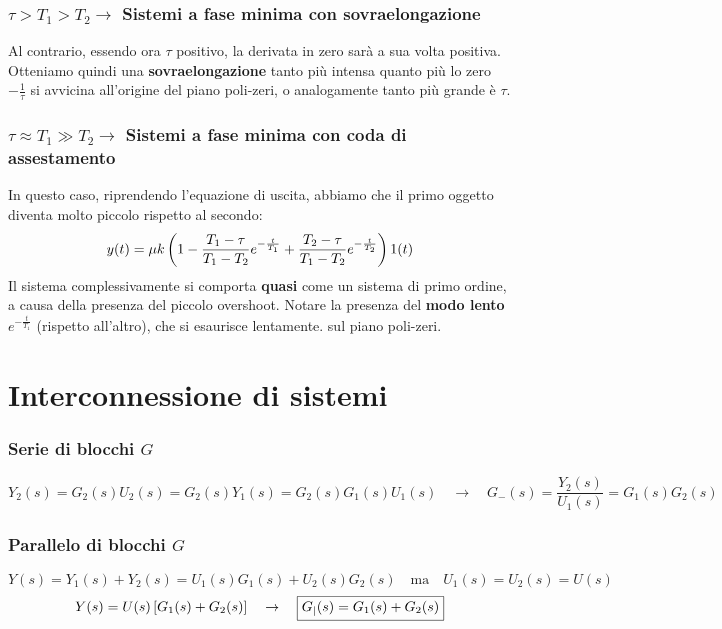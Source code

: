 \subsection{$\tau > T_1 > T_2 \rightarrow$ Sistemi a fase minima con sovraelongazione}
Al contrario, essendo ora $\tau$ positivo, la derivata in zero sarà a sua volta positiva. Otteniamo quindi una \textbf{sovraelongazione} tanto più intensa quanto più lo zero $-\frac{1}{\tau}$ si avvicina all'origine del piano poli-zeri, o analogamente tanto più grande è $\tau$.
\subsection{$\tau \approx T_1 \gg T_2 \rightarrow$ Sistemi a fase minima con coda di assestamento}
In questo caso, riprendendo l'equazione di uscita, abbiamo che il primo oggetto diventa molto piccolo rispetto al secondo:
\begin{equation*}
y(t) = \mu k \left( 1-\frac{T_1-\tau}{T_1 -T_2}e^{-\frac{t}{T_1}} + \frac{T_2 - \tau}{T_1 - T_2}e^{-\frac{t}{T_2}} \right)1(t) 
\end{equation*}
Il sistema complessivamente si comporta \textbf{quasi} come un sistema di primo ordine, a causa della presenza del piccolo overshoot. Notare la presenza del \textbf{modo lento} $e^{-\frac{t}{T_1}}$ (rispetto all'altro), che si esaurisce lentamente.
sul piano poli-zeri.

\chapter{Interconnessione di sistemi}
\subsection{Serie di blocchi $G$}
\bb
\begin{equation}
Y_2(s) = G_2(s)U_2(s) = G_2(s)Y_1(s) = G_2(s)G_1(s)U_1(s) \quad \rightarrow \quad \boxed{G_{-}(s) = \frac{Y_2(s)}{U_1(s)} = G_1(s)G_2(s)}
\end{equation}
\subsection{Parallelo di blocchi $G$}
\bb
\begin{equation*}
Y(s) = Y_1(s) + Y_2(s) = U_1(s)G_1(s) + U_2(s)G_2(s) \quad \textrm{ma} \quad U_1(s) = U_2(s) = U(s)
\end{equation*}
\begin{equation}
Y(s) = U(s)\left[ G_1(s)+G_2(s) \right] \quad \rightarrow \quad \boxed{G_|(s) = G_1(s) + G_2(s)}
\end{equation}
